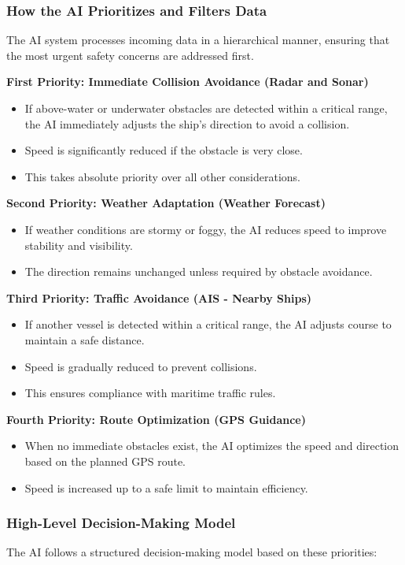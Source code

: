\documentclass{article}
\begin{document}
\subsubsection{How the AI Prioritizes and Filters Data}
The AI system processes incoming data in a hierarchical manner, ensuring that the most urgent safety concerns are addressed first.

\textbf{First Priority: Immediate Collision Avoidance (Radar and Sonar)}
\begin{itemize}
    \item If above-water or underwater obstacles are detected within a critical range, the AI immediately adjusts the ship’s direction to avoid a collision.
    \item Speed is significantly reduced if the obstacle is very close.
    \item This takes absolute priority over all other considerations.
\end{itemize}

\textbf{Second Priority: Weather Adaptation (Weather Forecast)}
\begin{itemize}
    \item If weather conditions are stormy or foggy, the AI reduces speed to improve stability and visibility.
    \item The direction remains unchanged unless required by obstacle avoidance.
\end{itemize}

\textbf{Third Priority: Traffic Avoidance (AIS - Nearby Ships)}
\begin{itemize}
    \item If another vessel is detected within a critical range, the AI adjusts course to maintain a safe distance.
    \item Speed is gradually reduced to prevent collisions.
    \item This ensures compliance with maritime traffic rules.
\end{itemize}

\textbf{Fourth Priority: Route Optimization (GPS Guidance)}
\begin{itemize}
    \item When no immediate obstacles exist, the AI optimizes the speed and direction based on the planned GPS route.
    \item Speed is increased up to a safe limit to maintain efficiency.
\end{itemize}

\subsubsection{\large High-Level Decision-Making Model}
The AI follows a structured decision-making model based on these priorities:
\end{document}

